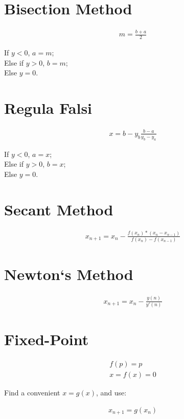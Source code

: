\section{Bisection Method}

\begin{align}
	m = \frac{b+a}{2}
	\label{eq:bisection}
\end{align}

	\noindent If $y < 0$, $a = m$; \\
	Else if $y > 0$, $b = m$; \\
	Else $y = 0$. \\

\section{Regula Falsi}

\begin{align}
	x = b - y_{b}\frac{b - a}{y_{b} - y_{a}}
	\label{eq:regulafalsi}
\end{align}

	\noindent If $y < 0$, $a = x$; \\
	Else if $y > 0$, $b = x$; \\
	Else $y = 0$. \\

\section{Secant Method}

\begin{align}
	x_{n+1} = x_{n} - \frac{f(x_{n})*(x_{n}-x_{n-1})}{f(x_{n})-f(x_{n-1})}
	\label{eq:secant}
\end{align}

\section{Newton`s Method}

\begin{align}
	x_{n+1} = x_{n} - \frac{y(n)}{y'(n)}
	\label{eq:newton}
\end{align}

\section{Fixed-Point}

\begin{align}
	f(p) = p \\
	x = f(x) = 0
\end{align}

Find a convenient $x = g(x)$, and use:

\begin{align}
	x_{n+1} = g(x_{n})
\end{align}